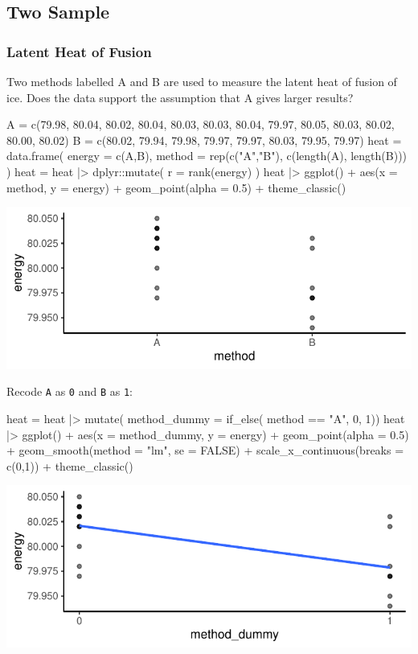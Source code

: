 \documentclass[a4paper]{article}\usepackage[]{graphicx}\usepackage[]{xcolor}
\makeatletter
\def\maxwidth{ %
  \ifdim\Gin@nat@width>\linewidth
    \linewidth
  \else
    \Gin@nat@width
  \fi
}
\makeatother
\begin{document}
\subsection{Two Sample}
\subsubsection{Latent Heat of Fusion}
Two methods labelled A and B are used to measure the latent heat of fusion of ice. Does the data support the assumption that A gives larger results?
\begin{Schunk}
\begin{Sinput}
A = c(79.98, 80.04, 80.02, 80.04, 80.03, 80.03, 80.04, 
      79.97, 80.05, 80.03, 80.02, 80.00, 80.02)
B = c(80.02, 79.94, 79.98, 79.97, 79.97, 80.03, 79.95, 
      79.97)
heat = data.frame(
  energy = c(A,B),
  method = rep(c("A","B"), c(length(A), length(B)))
)
heat = heat |> dplyr::mutate(
  r = rank(energy)
)
heat |> ggplot() + 
  aes(x = method, y = energy) + 
  geom_point(alpha = 0.5) +
  theme_classic()
\end{Sinput}


{\centering \includegraphics[width=\maxwidth]{figure/listings-unnamed-chunk-191-1} 

}

\end{Schunk}
Recode \lstinline|A| as \lstinline|0| and \lstinline|B| as \lstinline|1|:
\begin{Schunk}
\begin{Sinput}
heat = heat |> mutate(
  method_dummy = if_else(
    method == "A", 0, 1))
heat |> ggplot() +
  aes(x = method_dummy, 
      y = energy) + 
  geom_point(alpha = 0.5) + 
  geom_smooth(method = "lm",
              se = FALSE) + 
  scale_x_continuous(breaks = c(0,1)) +
  theme_classic()
\end{Sinput}


{\centering \includegraphics[width=\maxwidth]{figure/listings-unnamed-chunk-192-1} 

}

\end{Schunk}
\end{document}
